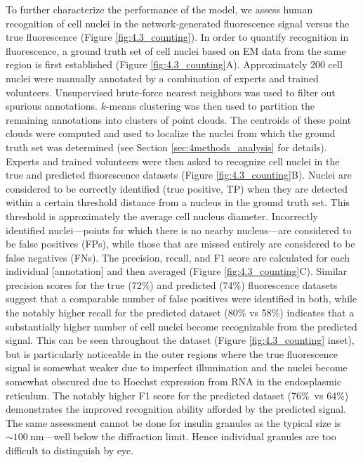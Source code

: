 To further characterize the performance of the model, we assess human recognition of cell nuclei in the network-generated fluorescence signal versus the true fluorescence (Figure \ref{fig:4.3_counting}). In order to quantify recognition in fluorescence, a ground truth set of cell nuclei based on EM data from the same region is first established (Figure \ref{fig:4.3_counting}A). Approximately 200 cell nuclei were manually annotated by a combination of experts and trained volunteers. Unsupervised brute-force nearest neighbors was used to filter out spurious annotations. $k$-means clustering was then used to partition the remaining annotations into clusters of point clouds. The centroids of these point clouds were computed and used to localize the nuclei from which the ground truth set was determined (see Section \ref{sec:4methods_analysis} for details).
Experts and trained volunteers were then asked to recognize cell nuclei in the true and predicted fluorescence datasets (Figure \ref{fig:4.3_counting}B). Nuclei are considered to be correctly identified (true positive, TP) when they are detected within a certain threshold distance from a nucleus in the ground truth set. This threshold is approximately the average cell nucleus diameter. Incorrectly identified nuclei---points for which there is no nearby nucleus---are considered to be false positives (FPs), while those that are missed entirely are considered to be false negatives (FNs).
The precision, recall, and F1 score are calculated for each individual [annotation] and then averaged (Figure \ref{fig:4.3_counting}C). Similar precision scores for the true (72\%) and predicted (74\%) fluorescence datasets suggest that a comparable number of false positives were identified in both, while the notably higher recall for the predicted dataset (80\% vs 58\%) indicates that a substantially higher number of cell nuclei become recognizable from the predicted signal. This can be seen throughout the dataset (Figure \ref{fig:4.3_counting} inset), but is particularly noticeable in the outer regions where the true fluorescence signal is somewhat weaker due to imperfect illumination and the nuclei become somewhat obscured due to Hoechst expression from RNA in the endosplasmic reticulum.
The notably higher F1 score for the predicted dataset (76\%\ vs 64\%) demonstrates the improved recognition ability afforded by the predicted signal.
The same assessment cannot be done for insulin granules as the typical size is ${\sim}\SI{100}{\nano\metre}$---well below the diffraction limit. Hence individual granules are too difficult to distinguish by eye.

